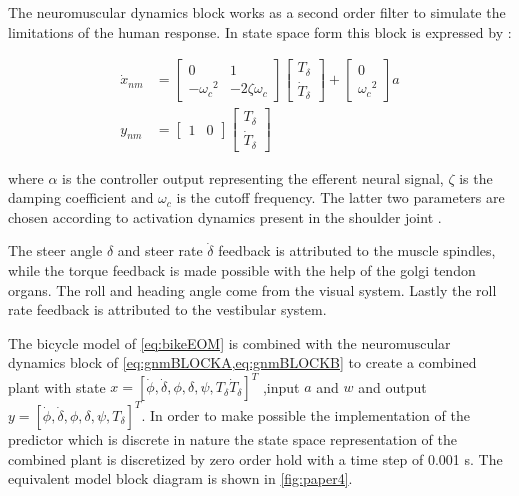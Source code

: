 The neuromuscular dynamics block works as a second order filter to simulate the limitations of the human response. In state space form this block is expressed by :

\begin{align}
\dot{x}_{nm} &= \begin{bmatrix}0 & 1 \\ -{\omega_c}^2 & -2\zeta{\omega_c}\end{bmatrix} \begin{bmatrix} T_\delta \\ \dot{T}_\delta\end{bmatrix} + \begin{bmatrix} 0 \\ {\omega_c}^2\end{bmatrix} a     \label{eq:gnmBLOCKA}    
    \\
y_{nm} &= \begin{bmatrix}1 & 0\end{bmatrix} \begin{bmatrix} T_\delta \\ \dot{T}_\delta\end{bmatrix}
    \label{eq:gnmBLOCKB}
\end{align}

where \ensuremath{\alpha} is the controller output representing the efferent neural signal, \ensuremath{\zeta} is the damping coefficient and \ensuremath{\omega_c} is the cutoff frequency. The latter two   parameters are chosen according to activation dynamics present in the shoulder joint \cite{happee2008posture}.

The steer angle \(\delta\) and steer rate \(\dot{\delta}\) feedback is attributed to the muscle spindles, while the torque feedback is made possible with the help of the golgi tendon organs. The roll and heading angle come from the visual system. Lastly the roll rate feedback is attributed to the vestibular system. 

The bicycle model of \cref{eq:bikeEOM} is combined with the neuromuscular dynamics block of \cref{eq:gnmBLOCKA,eq:gnmBLOCKB} to create a combined  plant with state \ensuremath{x=[\dot{\phi}, \dot{\delta}, \phi, \delta, \psi, T_\delta \dot{T}_\delta]^{T}} ,input \ensuremath{a} and \ensuremath{w} and output \ensuremath{y=[\dot{\phi}, \dot{\delta}, \phi, \delta, \psi, T_\delta]^{T}}. In order to make possible the implementation of the predictor which is discrete in nature the state space representation of the combined plant is discretized by zero order hold with a time step of 0.001 \si{\second}. The equivalent model block diagram is shown in \cref{fig:paper4}.

